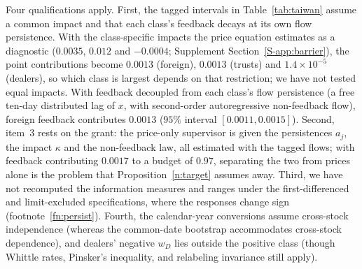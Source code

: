 \documentclass[11pt,letterpaper]{article}
\theoremstyle{definition}
\begin{document}
Four qualifications apply. First, the tagged intervals in Table~\ref{tab:taiwan} assume a common impact and that each class's feedback decays at its own flow persistence. With the class-specific impacts the price equation estimates as a diagnostic ($0.0035$, $0.012$ and $-0.0004$; Supplement Section~\ref{S-app:barrier}), the point contributions become $0.0013$ (foreign), $0.0013$ (trusts) and $1.4 \times 10^{-5}$ (dealers), so which class is largest depends on that restriction; we have not tested equal impacts. With feedback decoupled from each class's flow persistence (a free ten-day distributed lag of $x$, with second-order autoregressive non-feedback flow), foreign feedback contributes $0.0013$ ($95\%$ interval $[0.0011, 0.0015]$). Second, item~3 rests on the grant: the price-only supervisor is given the persistences $a_j$, the impact $\kappa$ and the non-feedback law, all estimated with the tagged flows; with feedback contributing $0.0017$ to a budget of $0.97$, separating the two from prices alone is the problem that Proposition~\ref{n:target} assumes away. Third, we have not recomputed the information measures and ranges under the first-differenced and limit-excluded specifications, where the responses change sign (footnote~\ref{fn:persist}). Fourth, the calendar-year conversions assume cross-stock independence (whereas the common-date bootstrap accommodates cross-stock dependence), and dealers' negative $w_D$ lies outside the positive class (though Whittle rates, Pinsker's inequality, and relabeling invariance still apply).
\end{document}
